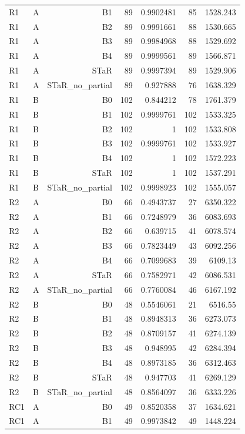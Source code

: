 \begin{longtable}{llrrrrr}
R1 & A & B1 & 89 & 0.9902481 & 85 & 1528.243 \\
R1 & A & B2 & 89 & 0.9991661 & 88 & 1530.665 \\
R1 & A & B3 & 89 & 0.9984968 & 88 & 1529.692 \\
R1 & A & B4 & 89 & 0.9999561 & 89 & 1566.871 \\
R1 & A & STaR & 89 & 0.9997394 & 89 & 1529.906 \\
R1 & A & STaR\_no\_partial & 89 & 0.927888 & 76 & 1638.329 \\
R1 & B & B0 & 102 & 0.844212 & 78 & 1761.379 \\
R1 & B & B1 & 102 & 0.9999761 & 102 & 1533.325 \\
R1 & B & B2 & 102 & 1 & 102 & 1533.808 \\
R1 & B & B3 & 102 & 0.9999761 & 102 & 1533.927 \\
R1 & B & B4 & 102 & 1 & 102 & 1572.223 \\
R1 & B & STaR & 102 & 1 & 102 & 1537.291 \\
R1 & B & STaR\_no\_partial & 102 & 0.9998923 & 102 & 1555.057 \\
R2 & A & B0 & 66 & 0.4943737 & 27 & 6350.322 \\
R2 & A & B1 & 66 & 0.7248979 & 36 & 6083.693 \\
R2 & A & B2 & 66 & 0.639715 & 41 & 6078.574 \\
R2 & A & B3 & 66 & 0.7823449 & 43 & 6092.256 \\
R2 & A & B4 & 66 & 0.7099683 & 39 & 6109.13 \\
R2 & A & STaR & 66 & 0.7582971 & 42 & 6086.531 \\
R2 & A & STaR\_no\_partial & 66 & 0.7760084 & 46 & 6167.192 \\
R2 & B & B0 & 48 & 0.5546061 & 21 & 6516.55 \\
R2 & B & B1 & 48 & 0.8948313 & 36 & 6273.073 \\
R2 & B & B2 & 48 & 0.8709157 & 41 & 6274.139 \\
R2 & B & B3 & 48 & 0.948995 & 42 & 6284.394 \\
R2 & B & B4 & 48 & 0.8973185 & 36 & 6312.463 \\
R2 & B & STaR & 48 & 0.947703 & 41 & 6269.129 \\
R2 & B & STaR\_no\_partial & 48 & 0.8564097 & 36 & 6333.226 \\
RC1 & A & B0 & 49 & 0.8520358 & 37 & 1634.621 \\
RC1 & A & B1 & 49 & 0.9973842 & 49 & 1448.224 \\

\end{longtable}
